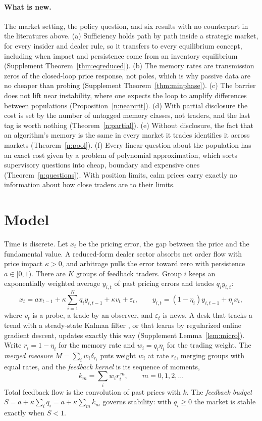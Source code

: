 \paragraph{What is new.} The market setting, the policy question, and six results with no counterpart in the literatures above. (a) Sufficiency holds path by path inside a strategic market, for every insider and dealer rule, so it transfers to every equilibrium concept, including when impact and persistence come from an inventory equilibrium (Supplement Theorem~\ref{thm:eqreduced}). (b) The memory rates are transmission zeros of the closed-loop price response, not poles, which is why passive data are no cheaper than probing (Supplement Theorem~\ref{thm:minphase}). (c) The barrier does not lift near instability, where one expects the loop to amplify differences between populations (Proposition~\ref{n:nearcrit}). (d) With partial disclosure the cost is set by the number of untagged memory classes, not traders, and the last tag is worth nothing (Theorem~\ref{n:partial}). (e) Without disclosure, the fact that an algorithm's memory is the same in every market it trades identifies it across markets (Theorem~\ref{n:pool}). (f) Every linear question about the population has an exact cost given by a problem of polynomial approximation, which sorts supervisory questions into cheap, boundary and expensive ones (Theorem~\ref{n:questions}). With position limits, calm prices carry exactly no information about how close traders are to their limits.

\section{Model}\label{n:model}

Time is discrete. Let $x_t$ be the pricing error, the gap between the price and the fundamental value. A reduced-form dealer sector absorbs net order flow with price impact $\kappa>0$, and arbitrage pulls the error toward zero with persistence $a\in[0,1)$. There are $K$ groups of feedback traders. Group $i$ keeps an exponentially weighted average $y_{i,t}$ of past pricing errors and trades $q_iy_{i,t}$:
\begin{equation}\label{n:eq:model}
x_t=ax_{t-1}+\kappa\sum_{i=1}^Kq_iy_{i,t-1}+\kappa v_t+\varepsilon_t,\qquad y_{i,t}=(1-\eta_i)y_{i,t-1}+\eta_ix_t,
\end{equation}
where $v_t$ is a probe, a trade by an observer, and $\varepsilon_t$ is news. A desk that tracks a trend with a steady-state Kalman filter \citep{muth1960}, or that learns by regularized online gradient descent, updates exactly this way (Supplement Lemma~\ref{lem:micro}). Write $r_i=1-\eta_i$ for the memory rate and $w_i=q_i\eta_i$ for the trading weight. The \emph{merged measure} $M=\sum_iw_i\delta_{r_i}$ puts weight $w_i$ at rate $r_i$, merging groups with equal rates, and the \emph{feedback kernel} is its sequence of moments,
\[
k_m=\sum_iw_ir_i^{\,m},\qquad m=0,1,2,\ldots
\]
Total feedback flow is the convolution of past prices with $k$. The \emph{feedback budget} $S=a+\kappa\sum_iq_i=a+\kappa\sum_mk_m$ governs stability: with $q_i\ge0$ the market is stable exactly when $S<1$.

